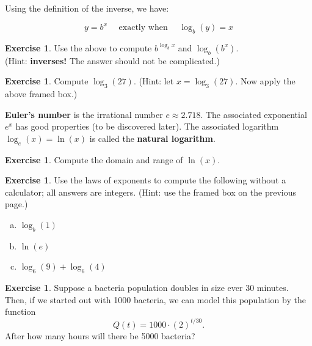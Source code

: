 \documentclass[11pt,reqno,final]{amsart}
\numberwithin{equation}{section}
\numberwithin{figure}{section}
\theoremstyle{definition} %
\newtheorem{exercise}[question]{Exercise}
\begin{document}
Using the definition of the inverse, we have:
\begin{framed}
        \[
                y = b^x \quad \mbox{ exactly when } \quad \log_b(y) = x
        \]
\end{framed}

\begin{exercise}
        Use the above to compute $b^{\log_b x}$ and $\log_b(b^x)$.\\
        (Hint: \textbf{inverses!} The answer should not be complicated.)
\end{exercise}

\newpage

\begin{exercise}
        Compute $\log_3(27)$.
        (Hint: let $x = \log_3(27)$. Now apply the above framed box.)
        \vfill
\end{exercise}

\textbf{Euler's number} is the irrational number $e \approx 2.718$.        
The associated exponential $e^x$ has good properties (to be discovered later).
The associated logarithm $\log_e(x) = \ln(x)$ is called the \textbf{natural logarithm}.

\begin{exercise}
        Compute the domain and range of $\ln(x)$.
        \vfill
\end{exercise}

\begin{exercise}
        Use the laws of exponents to compute the following without a calculator; all answers are integers.
        (Hint: use the framed box on the previous page.)        
        \begin{enumerate}[(a)]
        \item $\log_b(1)$ \vfill
        \item $\ln(e)$ \vfill
        \item $\log_6(9) + \log_6(4)$ \vfill
        \end{enumerate}
\end{exercise}

\begin{exercise}
        Suppose a bacteria population doubles in size ever 30 minutes.
        Then, if we started out with 1000 bacteria, we can model this population by the function
        \[
                Q(t) = 1000 \cdot (2)^{t/30}.
        \]
        After how many hours will there be 5000 bacteria?
        \vfill
\end{exercise}
\end{document}
